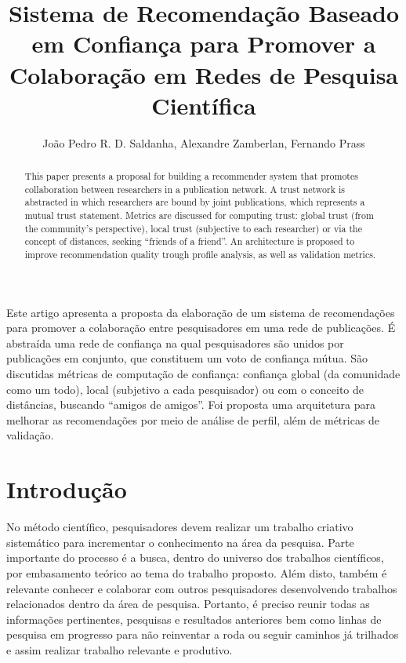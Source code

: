\documentclass[12pt]{article}
\title{Sistema de Recomendação Baseado em Confiança para Promover a Colaboração em Redes de Pesquisa Científica}
\author{João Pedro R. D. Saldanha\inst{1}, Alexandre Zamberlan\inst{1}, Fernando Prass\inst{1}}
\begin{document}
 

\maketitle

\begin{abstract}
  This paper presents a proposal for building a recommender system that promotes collaboration between researchers in a 
  publication network. A trust network is abstracted in which researchers are bound by joint publications, which represents 
  a mutual trust statement. Metrics are discussed for  computing trust: global trust (from the community’s perspective), 
  local trust (subjective to each researcher) or via the concept of distances, seeking “friends of a friend”. An architecture 
  is proposed to improve recommendation quality trough profile analysis, as well as validation metrics.
\end{abstract}

\begin{resumo} 
  Este artigo apresenta a proposta da elaboração de um sistema de recomendações para promover a colaboração entre pesquisadores 
  em uma rede de publicações. É abstraída uma rede de confiança na qual pesquisadores são unidos por publicações em conjunto, 
  que constituem um voto de confiança mútua. São discutidas métricas de computação de confiança: confiança global (da 
  comunidade como um todo), local (subjetivo a cada pesquisador) ou com o conceito de distâncias, buscando “amigos de amigos”. 
  Foi proposta uma arquitetura para melhorar as recomendações por meio de análise  de perfil, além de métricas de validação.
\end{resumo}


\section{Introdução}

No método científico, pesquisadores devem realizar um trabalho criativo sistemático para incrementar 
o conhecimento na área da pesquisa. Parte importante do processo é a busca, dentro do universo dos 
trabalhos científicos, por embasamento teórico ao tema do trabalho proposto. Além disto, também é 
relevante conhecer e colaborar com outros pesquisadores desenvolvendo trabalhos relacionados dentro da 
área de pesquisa.  Portanto, é preciso reunir todas as informações pertinentes, pesquisas e resultados 
anteriores bem como linhas de pesquisa em progresso para não reinventar a roda ou seguir caminhos já 
trilhados e assim realizar trabalho relevante e produtivo.
\end{document}
